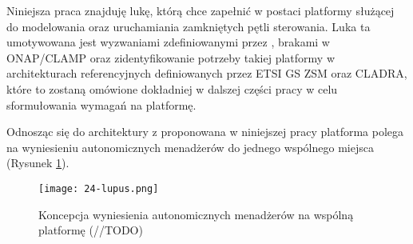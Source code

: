 Niniejsza praca znajduję lukę, którą chce zapełnić w postaci platformy służącej do modelowania oraz uruchamiania zamkniętych pętli sterowania. Luka ta umotywowana jest wyzwaniami zdefiniowanymi przez \cite{fallon2019}, brakami w ONAP/CLAMP oraz zidentyfikowanie potrzeby takiej platformy w architekturach referencyjnych definiowanych przez ETSI GS ZSM oraz CLADRA, które to zostaną omówione dokładniej w dalszej części pracy w celu sformułowania wymagań na platformę. 

Odnosząc się do architektury z \cite{kephart2003} proponowana w niniejszej pracy platforma polega na wyniesieniu autonomicznych menadżerów do jednego wspólnego miejsca (Rysunek \ref{fig:24-lupus}).

\begin{figure}[!htbp]
    \centering \texttt{[image: 24-lupus.png]}
    \caption{Koncepcja wyniesienia autonomicznych menadżerów na wspólną platformę (//TODO)}\label{fig:24-lupus}
\end{figure}